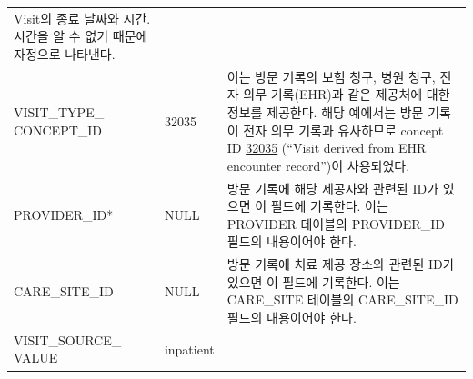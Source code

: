 \documentclass[10.5pt]{book}
\theoremstyle{definition}
\theoremstyle{definition}
\theoremstyle{definition}
\theoremstyle{remark}
\begin{document}
\begin{longtable}[]{@{}lll@{}}
\begin{minipage}[t]{0.48\columnwidth}
Visit의 종료 날짜와 시간. 시간을 알 수 없기 때문에 자정으로
나타낸다.\strut
\end{minipage}\tabularnewline
\begin{minipage}[t]{0.28\columnwidth}\raggedright\strut
VISIT\_TYPE\_ CONCEPT\_ID\strut
\end{minipage} & \begin{minipage}[t]{0.16\columnwidth}\raggedright\strut
32035\strut
\end{minipage} & \begin{minipage}[t]{0.48\columnwidth}\raggedright\strut
이는 방문 기록의 보험 청구, 병원 청구, 전자 의무 기록(EHR)과 같은
제공처에 대한 정보를 제공한다. 해당 예에서는 방문 기록이 전자 의무
기록과 유사하므로 concept ID
\href{http://athena.ohdsi.org/search-terms/terms/32035}{32035} (``Visit
derived from EHR encounter record'')이 사용되었다.\strut
\end{minipage}\tabularnewline
\begin{minipage}[t]{0.28\columnwidth}\raggedright\strut
PROVIDER\_ID*\strut
\end{minipage} & \begin{minipage}[t]{0.16\columnwidth}\raggedright\strut
NULL\strut
\end{minipage} & \begin{minipage}[t]{0.48\columnwidth}\raggedright\strut
방문 기록에 해당 제공자와 관련된 ID가 있으면 이 필드에 기록한다. 이는
PROVIDER 테이블의 PROVIDER\_ID 필드의 내용이어야 한다.\strut
\end{minipage}\tabularnewline
\begin{minipage}[t]{0.28\columnwidth}\raggedright\strut
CARE\_SITE\_ID\strut
\end{minipage} & \begin{minipage}[t]{0.16\columnwidth}\raggedright\strut
NULL\strut
\end{minipage} & \begin{minipage}[t]{0.48\columnwidth}\raggedright\strut
방문 기록에 치료 제공 장소와 관련된 ID가 있으면 이 필드에 기록한다. 이는
CARE\_SITE 테이블의 CARE\_SITE\_ID 필드의 내용이어야 한다.\strut
\end{minipage}\tabularnewline
\begin{minipage}[t]{0.28\columnwidth}\raggedright\strut
VISIT\_SOURCE\_ VALUE\strut
\end{minipage} & \begin{minipage}[t]{0.16\columnwidth}\raggedright\strut
inpatient\strut
\end{minipage} & \begin{minipage}[t]{0.48\columnwidth}\raggedright\strut

\end{minipage}
\end{longtable}
\end{document}
